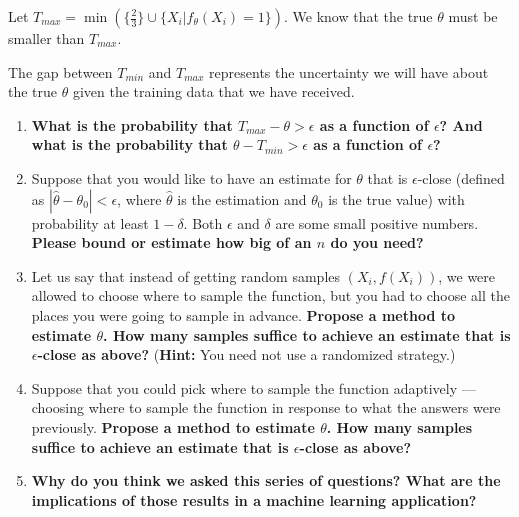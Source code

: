 \documentclass{article}\usepackage[utf8]{inputenc}\usepackage[margin=0.4cm,top=0.4cm,bottom=0.4cm]{geometry}\usepackage[usenames,dvipsnames,svgnames,table]{xcolor}
\begin{document}
\noindent Let $T_{max} = \min(\{\frac{2}{3}\} \cup \{ X_i | f_\theta(X_i) = 1\})$. We know that the true $\theta$ must be smaller than $T_{max}$. 
\vspace{3pt}

\noindent The gap between $T_{min}$ and $T_{max}$ represents the uncertainty we will have about the true $\theta$ given the training data that we have received. 
\begin{enumerate}
\item \textbf{What is the probability that $T_{max} - \theta > \epsilon$ as a function of $\epsilon$? And what is the probability that $\theta - T_{min} > \epsilon$ as a function of $\epsilon$?}
\BeginSolution

\EndSolution
\item Suppose that you would like to have an estimate for $\theta$ that is $\epsilon$-close (defined as $|\hat{\theta} - \theta_0| < \epsilon$, where $\hat{\theta}$ is the estimation and $\theta_0$ is the true value) with probability at least $1-\delta$. Both $\epsilon$ and $\delta$ are some small positive numbers. \textbf{Please bound or estimate how big of an $n$ do you need? } 
\BeginSolution

\EndSolution
\item Let us say that instead of getting random samples $(X_i, f(X_i))$, we were allowed to choose where to sample the function, but you had to choose all the places you were going to sample in advance. \textbf{Propose a method to estimate $\theta$. How many samples suffice to achieve an estimate that is $\epsilon$-close as above?} (\textbf{Hint:} You need not use a randomized strategy.)
\BeginSolution

\EndSolution
\item Suppose that you could pick where to sample the function adaptively --- choosing where to sample the function in response to what the answers were previously. \textbf{Propose a method to estimate $\theta$. How many samples suffice to achieve an estimate that is $\epsilon$-close as above?}
\BeginSolution

\EndSolution
\item \textbf{Why do you think we asked this series of questions? What are the implications of those results in a machine learning application?}
\BeginSolution

\EndSolution
\end{enumerate}
\clearpage
\end{document}
